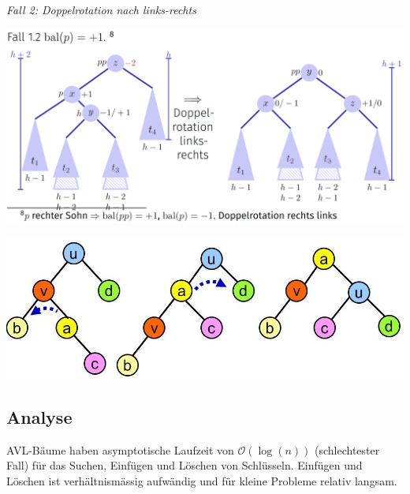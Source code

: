 \begin{sectionbox}
\textit{Fall 2: Doppelrotation nach links-rechts}\par
\begin{center}
    \includegraphics[width = \columnwidth]{../img/rotLR.png} \par\smallskip
    \includegraphics[width = \columnwidth]{../img/Doppelrotationen.jpg}
\end{center}\smallskip
\end{sectionbox}
\vspace{-4pt}
\begin{sectionbox}
\subsection{Analyse}\smallskip
AVL-Bäume haben asymptotische Laufzeit von $\mathcal{O}(\operatorname{log}(n))$ (schlechtester Fall) für das Suchen, Einfügen und Löschen von Schlüsseln. Einfügen und Löschen ist verhältnismässig aufwändig und für kleine Probleme relativ langsam.
\end{sectionbox}


